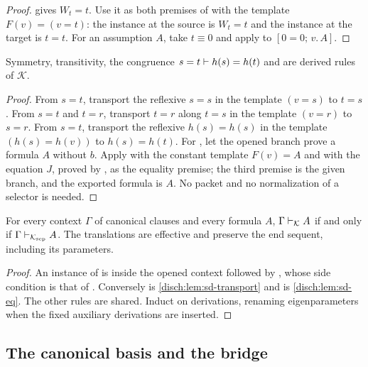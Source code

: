 \begin{proof}
 gives $W_t=t$. Use it as both premises of 
with the template $F(v)=(v=t)$: the instance at the source is $W_t=t$ and
the instance at the target is $t=t$. For an assumption $A$, take $t\equiv
0$ and apply  to $[0=0;\,v.\,A]$.
\end{proof}

\begin{lemma}
\label{disch:lem:sd-eq}
Symmetry, transitivity, the congruence $s=t\vdash h(s)=h(t)$ and
 are derived rules of $\mathcal K$.
\end{lemma}

\begin{proof}
From $s=t$, transport the reflexive $s=s$ in the template $(v=s)$ to
$t=s$. From $s=t$ and $t=r$, transport $t=r$ along $t=s$ in the template
$(v=r)$ to $s=r$. From $s=t$, transport the reflexive $h(s)=h(s)$ in the
template $(h(s)=h(v))$ to $h(s)=h(t)$. For , let the opened
branch prove a formula $A$ without $b$. Apply  with the
constant template $F(v)=A$ and with the equation $J$, proved by
, as the equality premise; the third premise is the given
branch, and the exported formula is $A$. No packet and no normalization of
a selector is needed.
\end{proof}

\begin{theorem}
\label{disch:thm:sd}
For every context $\Gamma$ of canonical clauses and every formula $A$,
$\Gamma\vdash_{\mathcal K}A$ if and only if
$\Gamma\vdash_{\mathcal K_{\mathrm{sep}}}A$. The translations are
effective and preserve the end sequent, including its parameters.
\end{theorem}

\begin{proof}
An instance of  is  inside the opened context
followed by , whose side condition is that of
. Conversely  is
\cref{disch:lem:sd-transport} and  is
\cref{disch:lem:sd-eq}. The other rules are shared. Induct on derivations,
renaming eigenparameters when the fixed auxiliary derivations are
inserted.
\end{proof}

\subsection{The canonical basis and the bridge}

